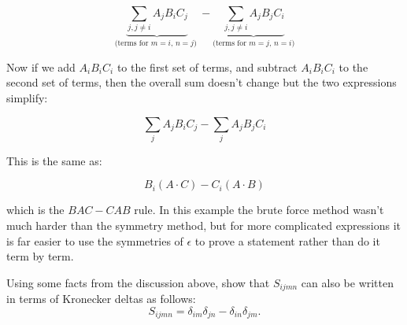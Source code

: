 \[ \underbrace{\sum_{j, j \neq i}  A_j B_i C_j}_{\text{(terms for $m=i$, $n=j$) }}    -  \underbrace{ \sum_{j, j \neq i}   A_j B_j C_i}_{\text{(terms for $m=j$, $n=i$)}} \] 
	                         	  


Now if we add $A_i B_i C_i$ to the first set of terms, and subtract $A_i B_i C_i$ to the second set of terms, then the overall sum doesn't change but the two 
expressions simplify:

\[ \sum_{j}  A_j B_i C_j    -  \sum_{j}   A_j B_j C_i  \]

This is the same as:

\[ B_i  (A \cdot C) - C_i (A \cdot B) \]

which is the $BAC-CAB$ rule.  In this example the brute force method wasn't much harder than the symmetry method, but for more complicated expressions it is far easier to use the symmetries of $\epsilon$ to prove a statement rather than do it term by term.

\begin{exercise}{}
Using some facts from the discussion above, show that  $S_{ijmn}$ can also be written in terms of Kronecker deltas as follows:
\[S_{ijmn} = \delta_{im} \delta_{jn} - \delta_{in} \delta_{jm}. \]
\end{exercise}

